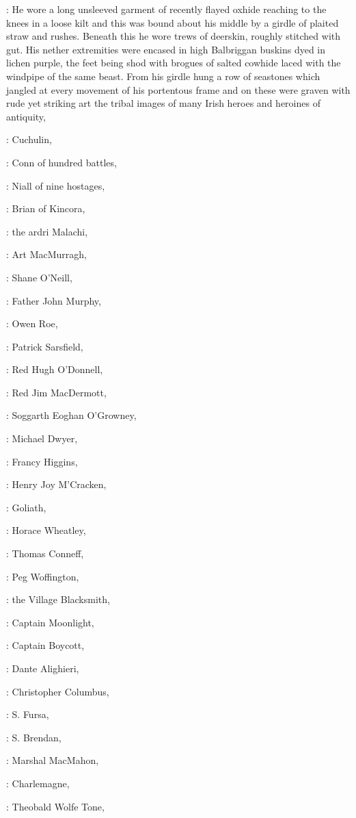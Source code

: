 :
He wore a long unsleeved garment of recently flayed oxhide reaching to the
knees in a loose kilt and this was bound about his middle by a girdle of
plaited straw and rushes.
Beneath this he wore trews of deerskin, roughly
stitched with gut. His nether extremities were encased in high Balbriggan
buskins dyed in lichen purple, the feet being shod with brogues of salted
cowhide laced with the windpipe of the same beast. From his girdle hung a
row of seastones which jangled at every movement of his portentous frame
and on these were graven with rude yet striking art the tribal images of
many Irish heroes and heroines of antiquity,

:
Cuchulin,

:
Conn of hundred battles,

:
Niall of nine hostages,

:
Brian of Kincora,

:
the ardri Malachi,

:
Art MacMurragh,

:
Shane O'Neill,

:
Father John Murphy,

:
Owen Roe,

:
Patrick Sarsfield,

:
Red Hugh O'Donnell,

:
Red Jim MacDermott,

:
Soggarth Eoghan O'Growney,

:
Michael Dwyer,

:
Francy Higgins,

:
Henry Joy M'Cracken,

:
Goliath,

:
Horace Wheatley,

:
Thomas Conneff,

:
Peg Woffington,

:
the Village Blacksmith,

:
Captain Moonlight,

:
Captain Boycott,

:
Dante Alighieri,

:
Christopher Columbus,

:
S. Fursa,

:
S. Brendan,

:
Marshal MacMahon,

:
Charlemagne,

:
Theobald Wolfe Tone,

